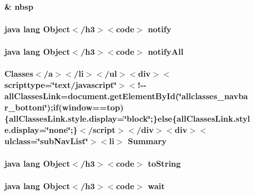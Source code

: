 \hypertarget{_tools_8html_aef915316f784c9063d942974538301a6}{
\subsubsection[{nbsp}]{\setlength{\rightskip}{0pt plus 5cm}\& nbsp}}\label{_tools_8html_aef915316f784c9063d942974538301a6}
\hypertarget{_tools_8html_ae99ae10b5010594dbda4794e02db271b}{
\subsubsection[{notify}]{\setlength{\rightskip}{0pt plus 5cm}java lang Object$<$/h3$>$$<$code$>$ notify}}\label{_tools_8html_ae99ae10b5010594dbda4794e02db271b}
\hypertarget{_tools_8html_a1279357e6e09e33e75b55eb05fdb6436}{
\subsubsection[{notify\-All}]{\setlength{\rightskip}{0pt plus 5cm}java lang Object$<$/h3$>$$<$code$>$ notify\-All}}\label{_tools_8html_a1279357e6e09e33e75b55eb05fdb6436}
\hypertarget{_tools_8html_a6f9ab45abc9b0679dc1b132fbacfc681}{
\subsubsection[{Summary}]{\setlength{\rightskip}{0pt plus 5cm}Classes$<$/{\bf a}$>$$<$/li$>$$<$/ul$>$$<$div$>$$<$scripttype=\char`\"{}text/javascript\char`\"{}$>$$<$!-\/-\/all\-Classes\-Link=document.\-get\-Element\-By\-Id(\char`\"{}allclasses\-\_\-navbar\-\_\-bottom\char`\"{});if(window==top)\{all\-Classes\-Link.\-style.\-display=\char`\"{}block\char`\"{};\}else\{all\-Classes\-Link.\-style.\-display=\char`\"{}none\char`\"{};\}$<$/script$>$$<$/div$>$$<$div$>$$<$ulclass=\char`\"{}sub\-Nav\-List\char`\"{}$>$$<$li$>$ Summary}}\label{_tools_8html_a6f9ab45abc9b0679dc1b132fbacfc681}
\hypertarget{_tools_8html_a36e8a76a4132c9a7081416f27d087615}{
\subsubsection[{to\-String}]{\setlength{\rightskip}{0pt plus 5cm}java lang Object$<$/h3$>$$<$code$>$ to\-String}}\label{_tools_8html_a36e8a76a4132c9a7081416f27d087615}
\hypertarget{_tools_8html_a9a9f0c22e5688d478c707f910f1c1aea}{
\subsubsection[{wait}]{\setlength{\rightskip}{0pt plus 5cm}java lang Object$<$/h3$>$$<$code$>$ wait}}\label{_tools_8html_a9a9f0c22e5688d478c707f910f1c1aea}

